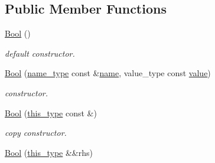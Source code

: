 \subsection*{Public Member Functions}
\begin{DoxyCompactItemize}
\item 
\hypertarget{classhryky_1_1reduction_1_1_bool_a332275830b09038643e3ce4b46c856fc}{\hyperlink{classhryky_1_1reduction_1_1_bool_a332275830b09038643e3ce4b46c856fc}{Bool} ()}\label{classhryky_1_1reduction_1_1_bool_a332275830b09038643e3ce4b46c856fc}

\begin{DoxyCompactList}\small\item\em default constructor. \end{DoxyCompactList}\item 
\hypertarget{classhryky_1_1reduction_1_1_bool_abc379c3c1d66c2e1f30f58f3390d8bdf}{\hyperlink{classhryky_1_1reduction_1_1_bool_abc379c3c1d66c2e1f30f58f3390d8bdf}{Bool} (\hyperlink{namespacehryky_1_1reduction_ac686c30a4c8d196bbd0f05629a6b921f}{name\-\_\-type} const \&\hyperlink{classhryky_1_1reduction_1_1_base_a842569265d741905eb8a353d3935f1d1}{name}, value\-\_\-type const \hyperlink{classhryky_1_1reduction_1_1_bool_adc9dc3d2690f737eace344341033c6ce}{value})}\label{classhryky_1_1reduction_1_1_bool_abc379c3c1d66c2e1f30f58f3390d8bdf}

\begin{DoxyCompactList}\small\item\em constructor. \end{DoxyCompactList}\item 
\hypertarget{classhryky_1_1reduction_1_1_bool_a3bd2dfeabbf5777a88cc86238580e39b}{\hyperlink{classhryky_1_1reduction_1_1_bool_a3bd2dfeabbf5777a88cc86238580e39b}{Bool} (\hyperlink{classhryky_1_1reduction_1_1_base_af02a7dee6042080b7380afd2f9500a42}{this\-\_\-type} const \&)}\label{classhryky_1_1reduction_1_1_bool_a3bd2dfeabbf5777a88cc86238580e39b}

\begin{DoxyCompactList}\small\item\em copy constructor. \end{DoxyCompactList}\item 
\hypertarget{classhryky_1_1reduction_1_1_bool_a1fd0c5f77aef3c45ddaf76efce7e3bd9}{\hyperlink{classhryky_1_1reduction_1_1_bool_a1fd0c5f77aef3c45ddaf76efce7e3bd9}{Bool} (\hyperlink{classhryky_1_1reduction_1_1_base_af02a7dee6042080b7380afd2f9500a42}{this\-\_\-type} \&\&rhs)}\label{classhryky_1_1reduction_1_1_bool_a1fd0c5f77aef3c45ddaf76efce7e3bd9}


\end{DoxyCompactItemize}
